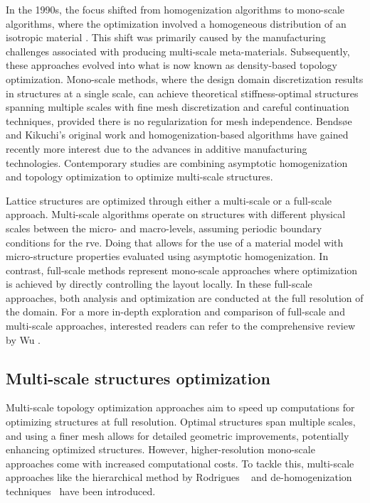 In the 1990s, the focus shifted from homogenization algorithms to mono-scale algorithms, where the optimization involved a homogeneous distribution of an isotropic material . This shift was primarily caused by the manufacturing challenges associated with producing multi-scale meta-materials. Subsequently, these approaches evolved into what is now known as density-based topology optimization. Mono-scale methods, where the design domain discretization results in structures at a single scale, can achieve theoretical stiffness-optimal structures spanning multiple scales with fine mesh discretization and careful continuation techniques, provided there is no regularization for mesh independence. Bendsøe and Kikuchi's original work and homogenization-based algorithms have gained recently more interest due to the advances in additive manufacturing technologies. Contemporary studies are combining asymptotic homogenization and topology optimization to optimize multi-scale structures. 

Lattice structures are optimized through either a multi-scale or a full-scale approach. Multi-scale algorithms operate on structures with different physical scales between the micro- and macro-levels, assuming periodic boundary conditions for the \gls{rve}. Doing that allows for the use of a material model with micro-structure properties evaluated using asymptotic homogenization. In contrast, full-scale methods represent mono-scale approaches where optimization is achieved by directly controlling the layout locally. In these full-scale approaches, both analysis and optimization are conducted at the full resolution of the domain. For a more in-depth exploration and comparison of full-scale and multi-scale approaches, interested readers can refer to the comprehensive review by Wu \etal {}.

\subsection{Multi-scale structures optimization}
Multi-scale topology optimization approaches aim to speed up computations for optimizing structures at full resolution. Optimal structures span multiple scales, and using a finer mesh allows for detailed geometric improvements, potentially enhancing optimized structures. However, higher-resolution mono-scale approaches come with increased computational costs. To tackle this, multi-scale approaches like the hierarchical method by Rodrigues \etal~ and de-homogenization techniques~ have been introduced.

